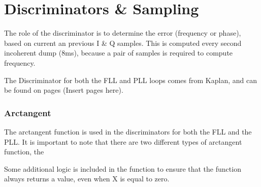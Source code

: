 \label{ch:Discriminators}
\chapter{Discriminators \& Sampling}

The role of the discriminator is to determine the error (frequency or phase), based on current an previous I \& Q samples. This is computed every second incoherent dump (8ms), because a pair of samples is required to compute frequency. 

The Discriminator for both the FLL and PLL loops comes from Kaplan, and can be found on pages (Insert pages here).





\begin{comment}
"It is important to note that the timing of each of the correlator channels will be locked to its own incoming signal and not to each other or to the microprocessor interrupts, so new data is generated asynchronously. The sampling instant of measurement data of all channels however is common to give a consistent navigation solution."

"Carrier DCO Programming
The following registers: CHx_CARRIER_DCO_INCR_HIGH (or X_DCO _INCR_HIGH) and CHx_CARRIER_DCO_INCR_LOW
are programmed in sequence with the relevant data according to the frequency bin being searched. It is always necessary to write to both the _HIGH and _LOW registers. Carrier DCO programming will become effective as soon as the channel is released (made active). If the channel is already active, writes to CHx_CARRIER_DCO_INCR_LOW are effective immediately. (A short delay of up to 175ns will occur, to allow synchronisation of the processor write operation to the chip operation.)"
\cite{GP2021}
\end{comment}

\subsection{Arctangent}
The arctangent function is used in the discriminators for both the FLL and the PLL. It is important to note that there are two different types of arctangent function, the 


Some additional logic is included in the function to ensure that the function always returns a value, even when X is equal to zero.

